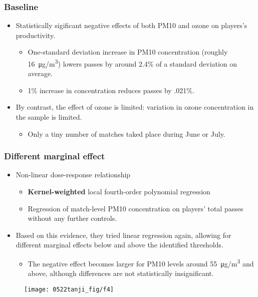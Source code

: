 \documentclass[dvipdfmx,11pt]{beamer}
\begin{document}
\begin{frame}\frametitle{Baseline}
  \begin{itemize}
    \item Statistically sigificant negative effects of both PM10 and ozone on players's productivity.
    \begin{itemize}
      \item One-standard deviation increase in PM10 concentration (roughly  \SI{16}{\micro g/m^3}) lowers passes by around 2.4\% of a standard deviation on average.
      \item 1\% increase in concentration reduces passes by .021\%.
    \end{itemize}
    \item By contrast, the effect of ozone is limited: variation in ozone concentration in the sample is limited.
    \begin{itemize}
      \item Only a tiny number of matches taked place during June or July.
    \end{itemize}
  \end{itemize}
\end{frame}

\begin{frame}\frametitle{Different marginal effect}
  \begin{itemize}
    \small
    \item Non-linear dose-response relationship
    \begin{itemize}
      \footnotesize
      \item \textbf{Kernel-weighted} local fourth-order polynomial regression
      \item Regression of match-level PM10 concentration on players' total passes without any further controls.
    \end{itemize}
    \item Based on this evidence, they tried linear regression again, allowing for different marginal effects below and above the identified thresholds.
    \begin{itemize}
      \footnotesize
      \item The negative effect becomes larger for PM10 levels around \SI{55}{\micro g/m^3} and above, although differences are not statistically insignificant.
    \end{itemize}
  \end{itemize}

  \begin{figure}
    \centering
    \texttt{[image: 0522tanji\_fig/f4]}
    \label{f4}
  \end{figure}
\end{frame}
\end{document}
